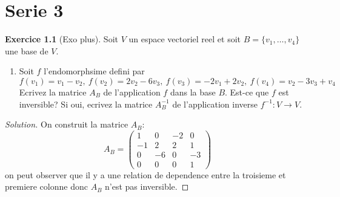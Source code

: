 \documentclass[a4paper,12pt,french]{report}
\theoremstyle{plain}
\theoremstyle{definition}
\newtheorem{exercise}{Exercice}[chapter]
\begin{document}
\chapter{Serie 3}

\begin{exercise}[Exo plus]
Soit $V$ un espace vectoriel reel et soit $B=\{ v_{1},\dots,v_{4} \}$ une base de $V$.
\begin{enumerate}
\item Soit $f$ l'endomorphsime defini par
$$
f(v_{1})=v_{1}-v_{2},~f(v_{2})=2v_{2}-6v_{3},~f(v_{3})=-2v_{1}+2v_{2},~f(v_{4})=v_{2}-3v_{3}+v_{4}
$$
Ecrivez la matrice $A_{B}$ de l'application $f$ dans la base $B$. Est-ce que $f$ est inversible? Si oui, ecrivez la matrice $A^{-1}_{B}$ de l'application inverse $f^{-1}:V\to V$.
\end{enumerate}
\end{exercise}
\begin{proof}[Solution]
On construit la matrice $A_{B}$:
$$
A_{B}=\begin{pmatrix}
1 & 0 & -2 & 0 \\
-1 & 2 & 2 & 1 \\
0 & -6 & 0 & -3 \\
0 & 0 & 0 & 1
\end{pmatrix}
$$
on peut observer que il y a une relation de dependence entre la troisieme et premiere colonne donc $A_{B}$ n'est pas inversible.
\end{proof}
\end{document}
